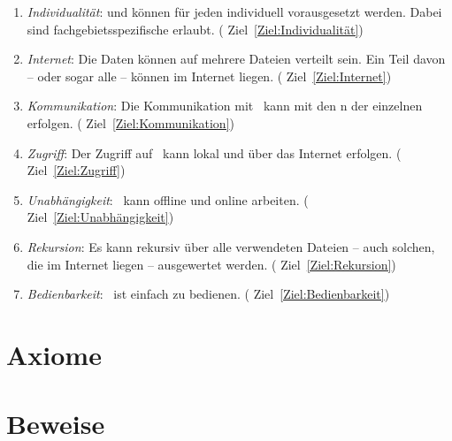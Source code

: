 \begin{enumerate}
	\item \label{Anforderung:Individualität} \emph{Individualität}:
	 und  können
	für jeden  individuell vorausgesetzt werden.
	Dabei sind fachgebietsspezifische  erlaubt.
	(\seename{} Ziel~\vref{Ziel:Individualität})
	
	\item \label{Anforderung:Internet} \emph{Internet}:
	Die Daten können auf mehrere Dateien verteilt sein.
	Ein Teil davon --
	oder sogar alle --
	können im Internet liegen.
	(\seename{} Ziel~\vref{Ziel:Internet})
	
	\item \label{Anforderung:Kommunikation} \emph{Kommunikation}:
	Die Kommunikation mit \ASBA\ kann mit den
	n der einzelnen  erfolgen.
	(\seename{} Ziel~\vref{Ziel:Kommunikation})
	
	\item \label{Anforderung:Zugriff} \emph{Zugriff}:
	Der Zugriff auf \ASBA\ kann lokal und über das Internet erfolgen.
	(\seename{} Ziel~\vref{Ziel:Zugriff})
	
	\item \label{Anforderung:Unabhängigkeit} \emph{Unabhängigkeit}:
	\ASBA\ kann offline und online arbeiten.
	(\seename{} Ziel~\vref{Ziel:Unabhängigkeit})
	
	\item \label{Anforderung:Rekursion} \emph{Rekursion}:
	Es kann rekursiv über alle verwendeten Dateien
	-- auch solchen, die im Internet liegen --
	ausgewertet werden.
	(\seename{} Ziel~\vref{Ziel:Rekursion})
	
	\item \label{Anforderung:Bedienbarkeit} \emph{Bedienbarkeit}:
	\ASBA\ ist einfach zu bedienen.
	(\seename{} Ziel~\vref{Ziel:Bedienbarkeit})
	
\end{enumerate}

\section{Axiome}%
\label{sec:Axiome}

\section{Beweise}%
\label{sec:Beweise}

